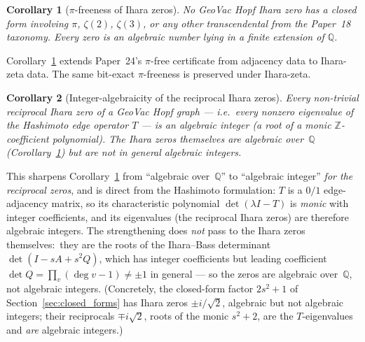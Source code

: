 \documentclass[11pt]{article}
\newtheorem{corollary}{Corollary}
\begin{document}
\begin{corollary}[$\pi$-freeness of Ihara zeros]
\label{cor:pi_free}
No GeoVac Hopf Ihara zero has a closed form involving $\pi$, $\zeta(2)$,
$\zeta(3)$, or any other transcendental from the Paper~18 taxonomy.
Every zero is an algebraic number lying in a finite extension of
$\mathbb{Q}$.
\end{corollary}

Corollary~\ref{cor:pi_free} extends Paper~24's $\pi$-free
certificate from adjacency data to Ihara-zeta data.  The same
bit-exact $\pi$-freeness is preserved under Ihara-zeta.

\begin{corollary}[Integer-algebraicity of the reciprocal Ihara zeros]
\label{cor:int_alg}
Every non-trivial \emph{reciprocal} Ihara zero of a GeoVac Hopf graph
--- i.e.\ every nonzero eigenvalue of the Hashimoto edge operator $T$
--- is an algebraic integer (a root of a \emph{monic}
$\mathbb{Z}$-coefficient polynomial). The Ihara zeros themselves are
algebraic over~$\mathbb{Q}$ (Corollary~\ref{cor:pi_free}) but are
\emph{not} in general algebraic integers.
\end{corollary}

This sharpens Corollary~\ref{cor:pi_free} from ``algebraic over~$\mathbb{Q}$''
to ``algebraic integer'' \emph{for the reciprocal zeros}, and is direct from
the Hashimoto formulation: $T$ is a $0/1$ edge-adjacency matrix, so its
characteristic polynomial $\det(\lambda I - T)$ is \emph{monic} with integer
coefficients, and its eigenvalues (the reciprocal Ihara zeros) are therefore
algebraic integers. The strengthening does \emph{not} pass to the Ihara zeros
themselves:\ they are the roots of the Ihara--Bass determinant
$\det(I - sA + s^2 Q)$, which has integer coefficients but leading coefficient
$\det Q = \prod_v (\deg v - 1) \neq \pm 1$ in general --- so the zeros are
algebraic over~$\mathbb{Q}$, not algebraic integers. (Concretely, the
closed-form factor $2s^2 + 1$ of Section~\ref{sec:closed_forms} has Ihara zeros
$\pm i/\sqrt{2}$, algebraic but not algebraic integers; their reciprocals
$\mp i\sqrt{2}$, roots of the monic $s^2 + 2$, are the $T$-eigenvalues and
\emph{are} algebraic integers.)
\end{document}
